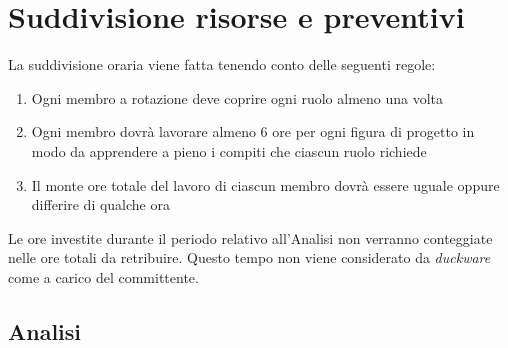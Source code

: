 \clearpage
\section{Suddivisione risorse e preventivi}
La suddivisione oraria viene fatta tenendo conto delle seguenti regole:
\begin{enumerate}
\item Ogni membro a rotazione deve coprire ogni ruolo almeno una volta
\item Ogni membro dovrà lavorare almeno 6 ore per ogni figura di progetto in modo da apprendere a pieno i compiti che ciascun ruolo richiede
\item Il monte ore totale del lavoro di ciascun membro dovrà essere uguale oppure differire di qualche ora
\end{enumerate}
Le ore investite durante il periodo relativo all'Analisi non verranno conteggiate nelle ore totali da retribuire. Questo tempo non viene considerato da \textit{duckware} come a carico del committente.
\clearpage
\subsection{Analisi}
